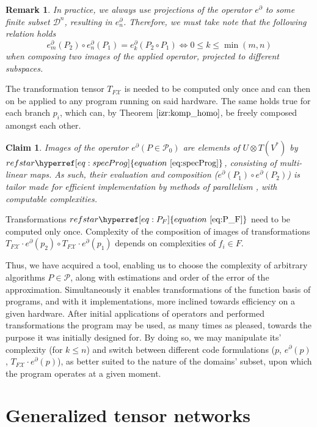 \documentclass{article}
\makeatletter
\newcommand{\X}{\mathcal{X}}
\newcommand{\dP}{\mathcal{P}}
\newcommand{\D}{\partial}
\newcommand{\DD}{\mathcal{D}}
\newtheorem{trditev}{Claim}[section]
\newtheorem{opomba}{Remark}[section]
\let\originaleqref\eqref %
\renewcommand{\eqref}[1]{%
  \begingroup%
  \let\ref\@refstar%
  \hyperref[#1]{%
    equation%
    ~\originaleqref{#1}%
  }%
  \endgroup
}
\makeatother
\begin{document}
\begin{opomba}
In practice, we always use projections of the operator $e^\D$ to some finite subset $\DD^n$, resulting in $e^\D_n$. Therefore, we must take note that the following relation holds
\begin{equation}
e^\D_m(P_2)\circ e^\D_n(P_1)=e^\D_k(P_2\circ P_1)\iff 0\le k\le \min(m,n)
\end{equation}
when composing two images of the applied operator, projected to different subspaces.
\end{opomba}

The transformation tensor $T_{F\X}$ is needed to be computed only once and can then on be applied to any program running on said hardware. The same holds true for each branch $p_i$, which can, by Theorem $\ref{izr:komp_homo}$, be freely composed amongst each other.

\begin{trditev}\label{clm:paralel}
Images of the operator $e^\D (P\in\dP_0)$ are elements of $U\otimes T(V^*)$ by $\eqref{eq:specProg}$, consisting of multi-linear maps. As such, their evaluation and composition ($e^\D(P_1)\circ e^\D(P_2)$) is tailor made for efficient implementation by methods of parallelism \cite{TensorGPU}, with computable complexities.
\end{trditev}

Transformations $\eqref{eq:P_F}$ need to be computed only once. Complexity of the composition of images of transformations $T_{F\X}\cdot e^\D(p_2)\circ T_{F\X}\cdot e^\D(p_1)$ depends on complexities of $f_i\in F$.

Thus, we have acquired a tool, enabling us to choose the complexity of arbitrary algorithms $P\in\dP$, along with estimations and order of the error of the approximation. Simultaneously it enables transformations of the function basis of programs, and with it implementations, more inclined towards efficiency on a given hardware. After initial applications of operators and performed transformations the program may be used, as many times as pleased, towards the purpose it was initially designed for. By doing so, we may manipulate its' complexity (for $k\le n$) and switch between different code formulations ($p$, $e^\D(p)$, $T_{F\X}\cdot e^\D(p)$), as better suited to the nature of the domains' subset, upon which the program operates at a given moment.

\section{Generalized tensor networks}\label{sec:generalTensorNet}
\end{document}
